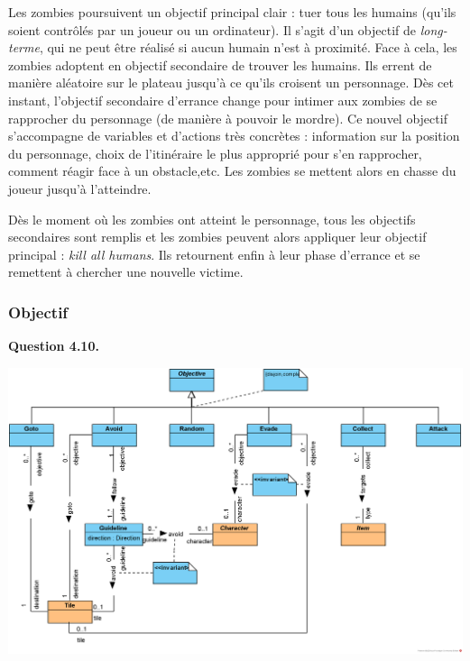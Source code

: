 \documentclass[oneside,a4paper]{book}
\begin{document}
Les zombies poursuivent un objectif principal clair : tuer tous les humains (qu'ils soient contrôlés par un joueur ou un ordinateur). Il s'agit d'un objectif de \textit{long-terme}, qui ne peut être réalisé si aucun humain n'est à proximité. Face à cela, les zombies adoptent en objectif secondaire de trouver les humains. Ils errent de manière aléatoire sur le plateau jusqu'à ce qu'ils croisent un personnage. Dès cet instant, l'objectif secondaire d'errance change pour intimer aux zombies de se rapprocher du personnage (de manière à pouvoir le mordre). Ce nouvel objectif s'accompagne de variables et d'actions très concrètes : information sur la position du personnage, choix de l'itinéraire le plus approprié pour s'en rapprocher, comment réagir face à un obstacle,etc. Les zombies se mettent alors en chasse du joueur jusqu'à l'atteindre. 

Dès le moment où les zombies ont atteint le personnage, tous les objectifs secondaires sont remplis et les zombies peuvent alors appliquer leur objectif principal : \textit{kill all humans}. Ils retournent enfin à leur phase d'errance et se remettent à chercher une nouvelle victime.

\subsubsection{Objectif}

\textbf{Question 4.10.}\label{Question 4.10.}\newline

\nopagebreak 

\includegraphics[width=\textwidth,height=\textheight,keepaspectratio]{Diagrams/DS-Objective.png}\newline
\end{document}
